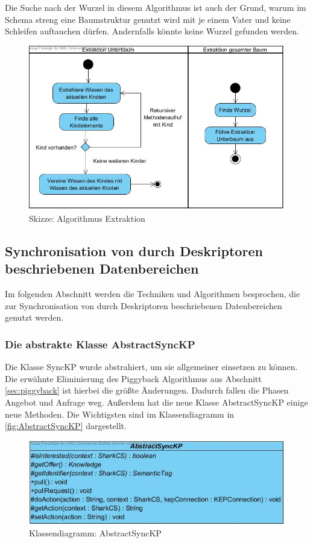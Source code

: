 \documentclass[a4paper]{article}
\begin{document}
	Die Suche nach der Wurzel in diesem Algorithmus ist auch der Grund, warum
	im Schema streng eine Baumstruktur genutzt wird mit je einem Vater und keine
	Schleifen auftauchen dürfen. Andernfalls könnte keine Wurzel gefunden werden.
	
	\begin{figure}[H]
		\includegraphics[width=\linewidth]{../Bilder/extraction.jpg}
		\caption{Skizze: Algorithmus Extraktion}
		\label{fig:extraction}
	\end{figure}	
	
	\subsection{Synchronisation von durch Deskriptoren beschriebenen Datenbereichen}	
	
	Im folgenden Abschnitt werden die Techniken und Algorithmen besprochen, die
	zur Synchronisation von durch Deskriptoren beschriebenen Datenbereichen genutzt
	werden.
	
	\subsubsection{Die abstrakte Klasse AbstractSyncKP}
	
	Die Klasse SyncKP wurde abstrahiert, um sie allgemeiner einsetzen zu können.
	Die erwähnte Eliminierung des Piggyback Algorithmus aus Abschnitt
	\ref{sec:piggyback} ist hierbei die größte Änderungen. Dadurch fallen die 
	Phasen Angebot und Anfrage weg. Außerdem hat die neue Klasse
	AbstractSyncKP einige neue Methoden. Die Wichtigsten sind im Klassendiagramm
	in \autoref{fig:AbstractSyncKP} dargestellt.
	
	\begin{figure}[H]
		\includegraphics[width=\linewidth]{../Bilder/AbstractSyncKP.jpg}
		\caption{Klassendiagramm: AbstractSyncKP}
		\label{fig:AbstractSyncKP}
	\end{figure}	
	
\end{document}
